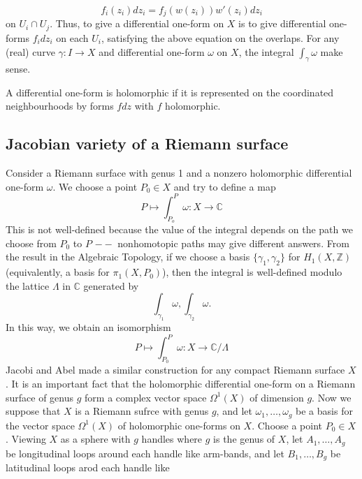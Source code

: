 \documentclass[11pt]{article}
\begin{document}
 \begin{equation*}
    f_i(z_i)dz_i=f_j(w(z_i))w'(z_i)dz_i
 \end{equation*}
 on  $U_i \cap U_j$. Thus, to give a differential one-form on $X$ is to give differential one-forms $f_idz_i$ on each $U_i$, satisfying the above equation
 on the overlaps. For any (real) curve $\gamma: I \rightarrow X$ and differential one-form $\omega$ on $X$, the integral $\int_{\gamma}\omega$
 make sense.
\begin{definition}
    A differential one-form is holomorphic if it is represented on the coordinated neighbourhoods by forms $fdz$ with $f$ holomorphic.
\end{definition} 
\subsection{Jacobian variety of a Riemann surface}
Consider a Riemann surface with genus 1 and a nonzero holomorphic differential one-form $\omega$. We choose a point $P_0\in X$ and try to 
define a map 
\begin{equation*}
    P\mapsto \int_{P_o}^{P}\omega : X\rightarrow \mathbb{C}
\end{equation*}
This is not well-defined because the value of the integral depends on the path we choose from $P_0$ to $P$ $--$ nonhomotopic paths
may give different answers. From the result in the Algebraic Topology, if we choose a basis $\{\gamma_1,\gamma_2\}$ for $H_1(X,\mathbb{Z})$
(equivalently, a basis for $\pi_1(X,P_0)$), then the integral is well-defined modulo the lattice $\Lambda$ in $\mathbb{C}$ generated by 
\begin{equation*}
    \int_{\gamma_1} \omega, \int_{\gamma_2}\omega.
\end{equation*}
In this way, we obtain an isomorphism 
\begin{equation*}
    P\mapsto \int_{P_0}^{P} \omega:X\rightarrow \mathbb{C}/\Lambda
\end{equation*}
Jacobi and Abel made a similar construction for any compact Riemann surface $X$. It is an important fact that the holomorphic differential
one-form on a Riemann surface of genus $g$ form a complex vector space $\Omega^1(X)$ of dimension $g$. Now we suppose that $X$ is 
a Riemann sufrce with genus $g$, and let $\omega_1,\ldots ,\omega_g$ be a basis for the vector space $\Omega^1(X)$ of holomorphic one-forms
on $X$. Choose a point $P_0\in X$. Viewing $X$ as a sphere with $g$ handles where $g$ is the genus of $X$, let 
$A_1,\ldots,A_g$ be longitudinal loops around each handle like arm-bands, and let $B_1,\ldots,B_g$ be latitudinal loops arod each handle like
\end{document}
